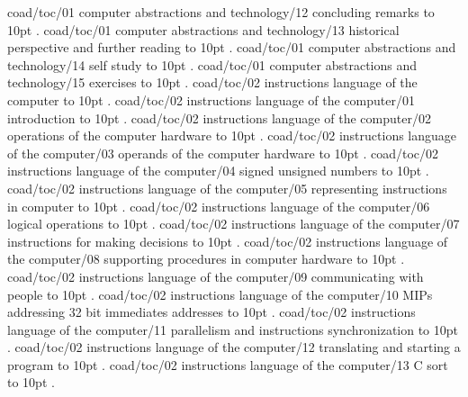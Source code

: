 \smallskip
coad/toc/01 computer abstractions and technology/12 concluding remarks \leaders\hbox to 10pt {\hss.\hss}  \hfill {}
\smallskip
coad/toc/01 computer abstractions and technology/13 historical perspective and further reading \leaders\hbox to 10pt {\hss.\hss}  \hfill {}
\smallskip
coad/toc/01 computer abstractions and technology/14 self study \leaders\hbox to 10pt {\hss.\hss}  \hfill {}
\smallskip
coad/toc/01 computer abstractions and technology/15 exercises \leaders\hbox to 10pt {\hss.\hss}  \hfill {}
\smallskip
coad/toc/02 instructions language of the computer \leaders\hbox to 10pt {\hss.\hss}  \hfill {}
\smallskip
coad/toc/02 instructions language of the computer/01 introduction \leaders\hbox to 10pt {\hss.\hss}  \hfill {}
\smallskip
coad/toc/02 instructions language of the computer/02 operations of the computer hardware \leaders\hbox to 10pt {\hss.\hss}  \hfill {}
\smallskip
coad/toc/02 instructions language of the computer/03 operands of the computer hardware \leaders\hbox to 10pt {\hss.\hss}  \hfill {}
\smallskip
coad/toc/02 instructions language of the computer/04 signed unsigned numbers \leaders\hbox to 10pt {\hss.\hss}  \hfill {}
\smallskip
coad/toc/02 instructions language of the computer/05 representing instructions in computer \leaders\hbox to 10pt {\hss.\hss}  \hfill {}
\smallskip
coad/toc/02 instructions language of the computer/06 logical operations \leaders\hbox to 10pt {\hss.\hss}  \hfill {}
\smallskip
coad/toc/02 instructions language of the computer/07 instructions for making decisions \leaders\hbox to 10pt {\hss.\hss}  \hfill {}
\smallskip
coad/toc/02 instructions language of the computer/08 supporting procedures in computer hardware \leaders\hbox to 10pt {\hss.\hss}  \hfill {}
\smallskip
coad/toc/02 instructions language of the computer/09 communicating with people \leaders\hbox to 10pt {\hss.\hss}  \hfill {}
\smallskip
coad/toc/02 instructions language of the computer/10 MIPs addressing 32 bit immediates addresses \leaders\hbox to 10pt {\hss.\hss}  \hfill {}
\smallskip
coad/toc/02 instructions language of the computer/11 parallelism and instructions synchronization \leaders\hbox to 10pt {\hss.\hss}  \hfill {}
\smallskip
coad/toc/02 instructions language of the computer/12 translating and starting a program \leaders\hbox to 10pt {\hss.\hss}  \hfill {}
\smallskip
coad/toc/02 instructions language of the computer/13 C sort \leaders\hbox to 10pt {\hss.\hss}  \hfill {}
\smallskip
